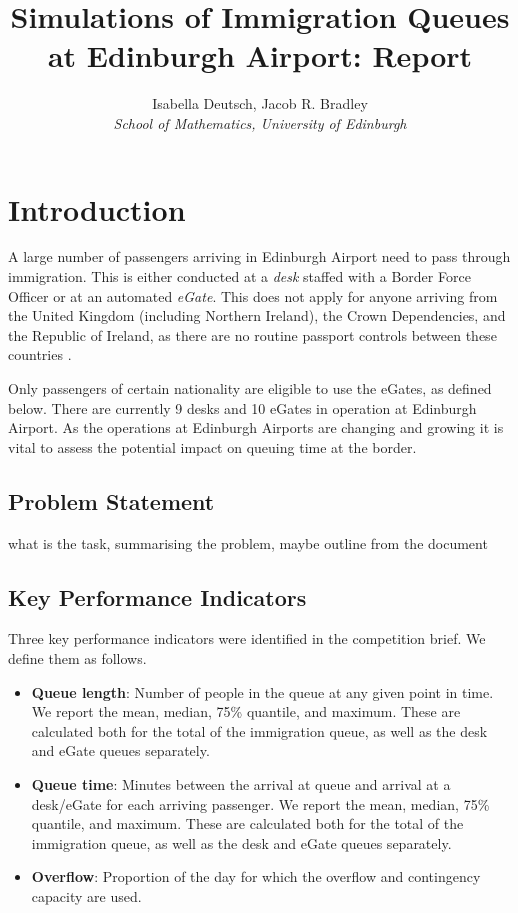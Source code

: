 \documentclass[10pt]{article}
\title{Simulations of Immigration Queues at Edinburgh Airport: Report}
\author{Isabella Deutsch, Jacob R. Bradley
 \\ \emph{School of Mathematics, University of Edinburgh}}
\begin{document}
\maketitle

\section{Introduction}

A large number of passengers arriving in Edinburgh Airport need to pass through immigration. This is either conducted at a \textit{desk} staffed with a Border Force Officer or at an automated \textit{eGate}. This does not apply for anyone arriving from the United Kingdom (including Northern Ireland), the Crown Dependencies, and the Republic of Ireland, as there are no routine passport controls between these countries \cite{common_travel_area}.

Only passengers of certain nationality are eligible to use the eGates, as defined below. There are currently 9 desks and 10 eGates in operation at Edinburgh Airport. As the operations at Edinburgh Airports are changing and growing it is vital to assess the potential impact on queuing time at the border. 

\subsection{Problem Statement}
what is the task, summarising the problem, maybe  outline from the document

\subsection{Key Performance Indicators}

Three key performance indicators were identified in the competition brief. We define them as follows.

\begin{itemize}
    \item \textbf{Queue length}: Number of people in the queue at any given point in time. We report the mean, median, 75\% quantile, and maximum. These are calculated both for the total of the immigration queue, as well as the desk and eGate queues separately.
    \item \textbf{Queue time}: Minutes between the arrival at queue and arrival at a desk/eGate for each arriving passenger. We report the mean, median, 75\% quantile, and maximum. These are calculated both for the total of the immigration queue, as well as the desk and eGate queues separately.
    \item \textbf{Overflow}: Proportion of the day for which the overflow and contingency capacity are used.
\end{itemize}
\end{document}
